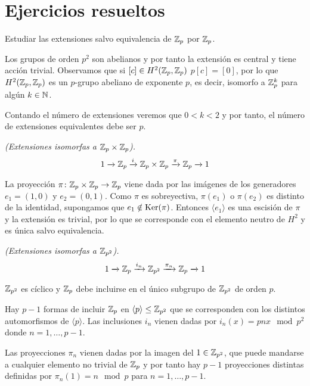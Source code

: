 \chapter{Ejercicios resueltos}

\begin{ejercicio}
	Estudiar las extensiones salvo equivalencia de $\Z_p$ por $\Z_p$. %
	\begin{solucion}
		Los grupos de orden $p^2$ son abelianos y por tanto la extensión es central y tiene acción trivial.
		Observamos que si $[c]\in H^2(\Z_p,\Z_p)$ $p[c] = [0]$, por lo que $H^2(\Z_p,\Z_p)$ es un $p$-grupo abeliano de exponente $p$, es decir, isomorfo a $\Z_p^k$ para algún $k\in \N$.
		
		Contando el número de extensiones veremos que $0<k<2$ y por tanto, el número de extensiones equivalentes debe ser $p$.
		
		\textit{(Extensiones isomorfas a $\Z_p\times \Z_p$).}
		\begin{equation*}
			\extension i \pi {\Z_p} {\Z_p\times \Z_p} {\Z_p}
		\end{equation*}
		
		La proyección $\homo \pi {\Z_p\times \Z_p} {\Z_p}$ viene dada por las imágenes de los generadores $e_1=(1,0)$ y $e_2=(0,1)$. Como $\pi$ es sobreyectiva, $\pi(e_1)$ o $\pi(e_2)$ es distinto de la identidad, supongamos que $e_1\notin \Ker(\pi)$. Entonces $\langle e_1 \rangle$ es una escisión de $\pi$ y la extensión es trivial, por lo que se corresponde con el elemento neutro de $H^2$ y es única salvo equivalencia.
		
		\textit{(Extensiones isomorfas a $\Z_{p^2}$).}
		\begin{equation*}
			\extension {i_n} {\pi_n} {\Z_p} {\Z_{p^2}} {\Z_p}
		\end{equation*}
		
		$\Z_{p^2}$ es cíclico y $\Z_p$ debe incluirse en el único subgrupo de $\Z_{p^2}$ de orden $p$. 
		
		Hay $p-1$ formas de incluir $\Z_p$ en $\langle p \rangle \leq \Z_{p^2}$ que se corresponden con los distintos automorfismos de $\langle p \rangle$. Las inclusiones $i_n$ vienen dadas por $i_n(x) = pnx \mod p^2$ donde $n=1,\ldots,p-1$.
		
		Las proyecciones $\pi_n$ vienen dadas por la imagen del $1\in \Z_{p^2}$, que puede mandarse a cualquier elemento no trivial de $\Z_p$ y por tanto hay $p-1$ proyecciones distintas definidas por $\pi_n(1) = n \mod p$ para $n=1,\ldots, p-1$.
		

\end{solucion}
\end{ejercicio}
